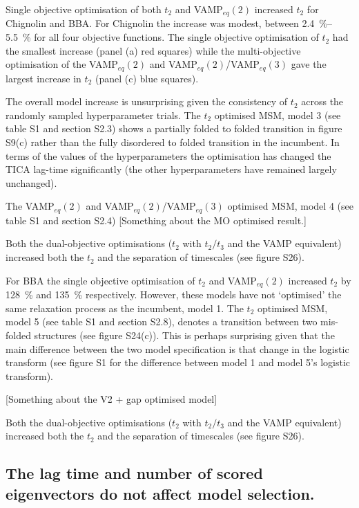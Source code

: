 \documentclass[journal=jacsat,manuscript=article]{achemso}
\begin{document}
Single objective optimisation of both $t_2$ and VAMP$_{eq}(2)$ increased $t_2$ for Chignolin and BBA.  For Chignolin the increase was modest, between \SIrange[range-phrase=---]{2.4}{5.5}{\percent} for all four objective functions.  The single objective optimisation of $t_2$ had the smallest increase (panel (a) red squares) while the multi-objective optimisation of the VAMP$_{eq}(2)$ and VAMP$_{eq}(2)$/VAMP$_{eq}(3)$ gave the largest increase in $t_2$ (panel (c) blue squares). 
 
The overall model increase is unsurprising given the consistency of $t_2$ across the randomly sampled hyperparameter trials.  The $t_2$ optimised MSM, model 3 (see table S1 and section S2.3) shows a partially folded to folded transition in figure S9(c) rather than the fully disordered to folded transition in the incumbent.  In terms of the values of the hyperparameters the optimisation has changed the TICA lag-time significantly (the other hyperparameters have remained largely unchanged). 

The VAMP$_{eq}(2)$ and VAMP$_{eq}(2)$/VAMP$_{eq}(3)$ optimised MSM, model 4 (see table S1 and section S2.4) [Something about the MO optimised result.]

Both the dual-objective optimisations ($t_2$ with $t_2/t_3$ and the VAMP equivalent) increased both the $t_2$ and the separation of timescales (see figure S26). 

For BBA the single objective optimisation of $t_2$ and VAMP$_{eq}(2)$ increased $t_2$ by \SI{128}{\percent} and \SI{135}{\percent} respectively.  However, these models have not `optimised' the same relaxation process as the incumbent, model 1. The $t_2$ optimised MSM, model 5 (see table S1 and section S2.8), denotes a transition between two mis-folded structures (see figure S24(c)).  This is perhaps surprising given that the main difference between the two model specification is that change in the logistic transform (see figure S1 for the difference between model 1 and model 5's logistic transform).  

[Something about the V2 + gap optimised model]

Both the dual-objective optimisations ($t_2$ with $t_2/t_3$ and the VAMP equivalent) increased both the $t_2$ and the separation of timescales (see figure S26). 


\subsection{The lag time and number of scored eigenvectors do not affect model selection.}\label{sec:lag_evs_selection}
\end{document}
